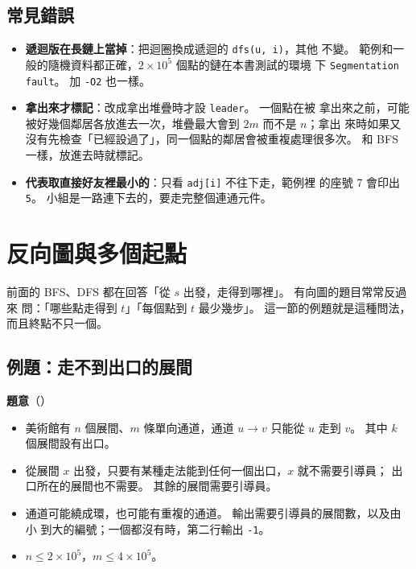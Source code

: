 \subsection{常見錯誤}

\begin{itemize}
\item \textbf{遞迴版在長鏈上當掉}：把迴圈換成遞迴的 \texttt{dfs(u, i)}，其他
不變。 範例和一般的隨機資料都正確，$2 \times 10^5$ 個點的鏈在本書測試的環境
下 \texttt{Segmentation fault}。 加 \texttt{-O2} 也一樣。
\item \textbf{拿出來才標記}：改成拿出堆疊時才設 \texttt{leader}。 一個點在被
拿出來之前，可能被好幾個鄰居各放進去一次，堆疊最大會到 $2m$ 而不是 $n$；拿出
來時如果又沒有先檢查「已經設過了」，同一個點的鄰居會被重複處理很多次。 和 BFS
一樣，放進去時就標記。
\item \textbf{代表取直接好友裡最小的}：只看 \texttt{adj[i]} 不往下走，範例裡
的座號 7 會印出 \texttt{5}。 小組是一路連下去的，要走完整個連通元件。
\end{itemize}

\section{反向圖與多個起點}
\label{sec:reverse}

前面的 BFS、DFS 都在回答「從 $s$ 出發，走得到哪裡」。 有向圖的題目常常反過來
問：「哪些點走得到 $t$」「每個點到 $t$ 最少幾步」。 這一節的例題就是這種問法，
而且終點不只一個。

\subsection{例題：走不到出口的展間}
\label{sec:ex-trapped}

\textbf{題意}（）

\begin{itemize}
\item 美術館有 $n$ 個展間、$m$ 條單向通道，通道 $u \to v$ 只能從 $u$ 走到
$v$。 其中 $k$ 個展間設有出口。
\item 從展間 $x$ 出發，只要有某種走法能到任何一個出口，$x$ 就不需要引導員；
出口所在的展間也不需要。 其餘的展間需要引導員。
\item 通道可能繞成環，也可能有重複的通道。 輸出需要引導員的展間數，以及由小
到大的編號；一個都沒有時，第二行輸出 \texttt{-1}。
\item $n \le 2 \times 10^5$，$m \le 4 \times 10^5$。
\end{itemize}

